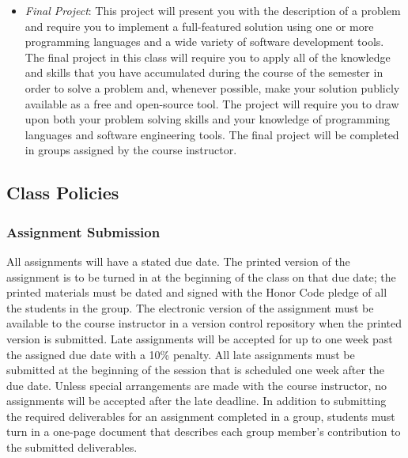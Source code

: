 \begin{itemize}

	\item {\em Final Project}: This project will present you with the description of a problem and require you to
		implement a full-featured solution using one or more programming languages and a wide variety of software
		development tools.  The final project in this class will require you to apply all of the knowledge and skills
		that you have accumulated during the course of the semester in order to solve a problem and, whenever possible,
		make your solution publicly available as a free and open-source tool.  The project will require you to draw upon
		both your problem solving skills and your knowledge of programming languages and software engineering tools. The
		final project will be completed in groups assigned by the course instructor.
		
\end{itemize}

\subsection*{Class Policies}

\subsubsection*{Assignment Submission}

All assignments will have a stated due date. The printed version of the assignment is to be turned in at the beginning
of the class on that due date; the printed materials must be dated and signed with the Honor Code pledge of all the
students in the group.  The electronic version of the assignment must be available to the course instructor in a version
control repository when the printed version is submitted. Late assignments will be accepted for up to one week past the
assigned due date with a 10\% penalty. All late assignments must be submitted at the beginning of the session that is
scheduled one week after the due date. Unless special arrangements are made with the course instructor, no assignments
will be accepted after the late deadline. In addition to submitting the required deliverables for an assignment
completed in a group, students must turn in a one-page document that describes each group member's contribution to the
submitted deliverables.  

